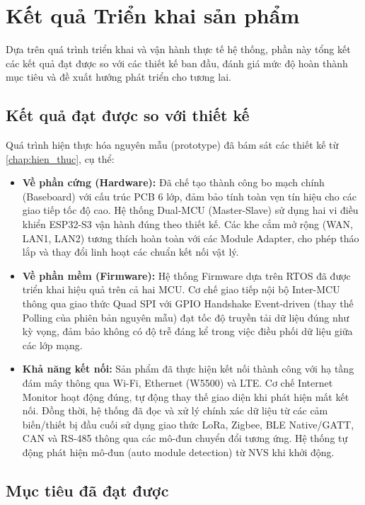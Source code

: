 \section{Kết quả Triển khai sản phẩm}

Dựa trên quá trình triển khai và vận hành thực tế hệ thống, phần này tổng kết các kết quả đạt được so với các thiết kế ban đầu, đánh giá mức độ hoàn thành mục tiêu và đề xuất hướng phát triển cho tương lai.

\subsection{Kết quả đạt được so với thiết kế}

Quá trình hiện thực hóa nguyên mẫu (prototype) đã bám sát các thiết kế từ \autoref{chap:hien_thuc}, cụ thể:

\begin{itemize}
    \item \textbf{Về phần cứng (Hardware):} Đã chế tạo thành công bo mạch chính (Baseboard) với cấu trúc PCB 6 lớp, đảm bảo tính toàn vẹn tín hiệu cho các giao tiếp tốc độ cao. Hệ thống Dual-MCU (Master-Slave) sử dụng hai vi điều khiển ESP32-S3 vận hành đúng theo thiết kế. Các khe cắm mở rộng (WAN, LAN1, LAN2) tương thích hoàn toàn với các Module Adapter, cho phép tháo lắp và thay đổi linh hoạt các chuẩn kết nối vật lý.
    \item \textbf{Về phần mềm (Firmware):} Hệ thống Firmware dựa trên RTOS đã được triển khai hiệu quả trên cả hai MCU. Cơ chế giao tiếp nội bộ Inter-MCU thông qua giao thức Quad SPI với GPIO Handshake Event-driven (thay thế Polling của phiên bản nguyên mẫu) đạt tốc độ truyền tải dữ liệu đúng như kỳ vọng, đảm bảo không có độ trễ đáng kể trong việc điều phối dữ liệu giữa các lớp mạng.
    \item \textbf{Khả năng kết nối:} Sản phẩm đã thực hiện kết nối thành công với hạ tầng đám mây thông qua Wi-Fi, Ethernet (W5500) và LTE. Cơ chế Internet Monitor hoạt động đúng, tự động thay thế giao diện khi phát hiện mất kết nối. Đồng thời, hệ thống đã đọc và xử lý chính xác dữ liệu từ các cảm biến/thiết bị đầu cuối sử dụng giao thức LoRa, Zigbee, BLE Native/GATT, CAN và RS-485 thông qua các mô-đun chuyển đổi tương ứng. Hệ thống tự động phát hiện mô-đun (auto module detection) từ NVS khi khởi động.
\end{itemize}

\subsection{Mục tiêu đã đạt được}

